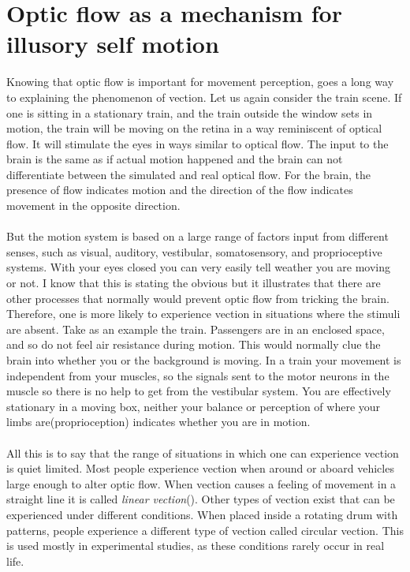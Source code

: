 \documentclass[11pt,a4paper,oneside,table,xcdraw]{article}
\begin{document}
\section{Optic flow as a mechanism for illusory self motion}
Knowing that optic flow is important for movement perception, goes a long way to explaining the phenomenon of vection. Let us again consider the train scene. If one is sitting in a stationary train, and the train outside the window sets in motion, the train will be moving on the retina in a way reminiscent of optical flow. It will stimulate the eyes in ways similar to optical flow. The input to the brain is the same as if actual motion happened and the brain can not differentiate between the simulated and real optical flow. For the brain, the presence of flow indicates motion and the direction of the flow indicates movement in the opposite direction.\\\\
But the motion system is based on a large range of factors input from different senses, such as visual, auditory, vestibular, somatosensory, and proprioceptive systems\cite{wind}. With your eyes closed you can very easily tell weather you are moving or not. I know that this is stating the obvious but it illustrates that there are other processes that normally would prevent optic flow from tricking the brain. Therefore, one is more likely to experience vection in situations where the stimuli are absent. Take as an example the train. Passengers are in an enclosed space, and so do not feel air resistance during motion. This would normally clue the brain into whether you or the background is moving. In a train your movement is independent from your muscles, so the signals sent to the motor neurons in the muscle so there is no help to get from the vestibular system. You are effectively stationary in a moving box, neither your balance or perception of where your limbs are(proprioception) indicates whether you are in motion.\\\\
All this is to say that the range of situations in which one can experience vection is quiet limited. Most people experience vection when around or aboard vehicles large enough to alter optic flow. When vection causes a feeling of movement in a straight line it is called \textit{linear vection}(\cite{vectionlinear}). Other types of vection exist that can be experienced under different conditions. When placed inside a rotating drum with patterns, people experience a different type of vection called circular vection. This is used mostly in experimental studies, as these conditions rarely occur in real life.
\end{document}
